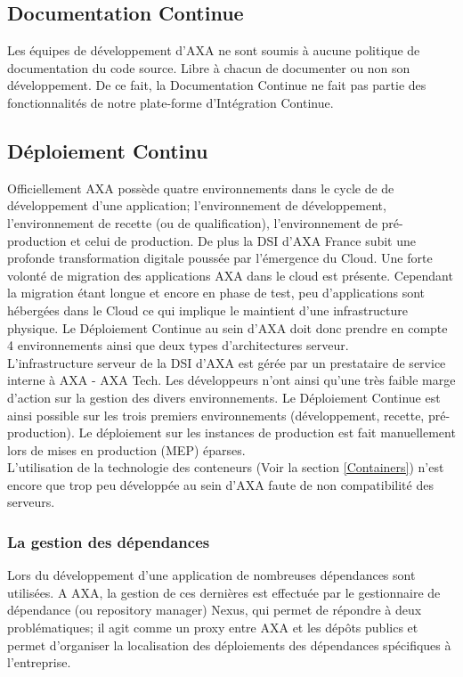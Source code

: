     \subsection{Documentation Continue}
    Les équipes de développement d'AXA ne sont soumis à aucune politique de documentation du code source. Libre à chacun de documenter ou non son développement. De ce fait, la Documentation Continue ne fait pas partie des fonctionnalités de notre plate-forme d'Intégration Continue.

    \subsection{Déploiement Continu}
    Officiellement AXA possède quatre environnements dans le cycle de de développement d'une application; l'environnement de développement, l'environnement de recette (ou de qualification), l'environnement de pré-production et celui de production. De plus la DSI d'AXA France subit une profonde transformation digitale poussée par l'émergence du Cloud. Une forte volonté de migration des applications AXA dans le cloud est présente. Cependant la migration étant longue et encore en phase de test, peu d'applications sont hébergées dans le Cloud ce qui implique le maintient d'une infrastructure physique. Le Déploiement Continue au sein d'AXA doit donc prendre en compte 4 environnements ainsi que deux types d'architectures serveur.\\

    L'infrastructure serveur de la DSI d'AXA est gérée par un prestataire de service interne à AXA - AXA Tech. Les développeurs n'ont ainsi qu'une très faible marge d'action sur la gestion des divers environnements. Le Déploiement Continue est ainsi possible sur les trois premiers environnements (développement, recette, pré-production). Le déploiement sur les instances de production est fait manuellement lors de mises en production (\gls{MEP}) éparses.\\

    L'utilisation de la technologie des conteneurs (Voir la section \ref{Containers}) n'est encore que trop peu développée au sein d'AXA faute de non compatibilité des serveurs.

      \subsubsection{La gestion des dépendances}\label{Nexus}
      Lors du développement d'une application de nombreuses dépendances sont utilisées. A AXA, la gestion de ces dernières est effectuée par le gestionnaire de dépendance (ou repository manager) Nexus, qui permet de répondre à deux problématiques; il agit comme un proxy entre AXA et les dépôts publics et permet d'organiser la localisation des déploiements des dépendances spécifiques à l'entreprise.\\

